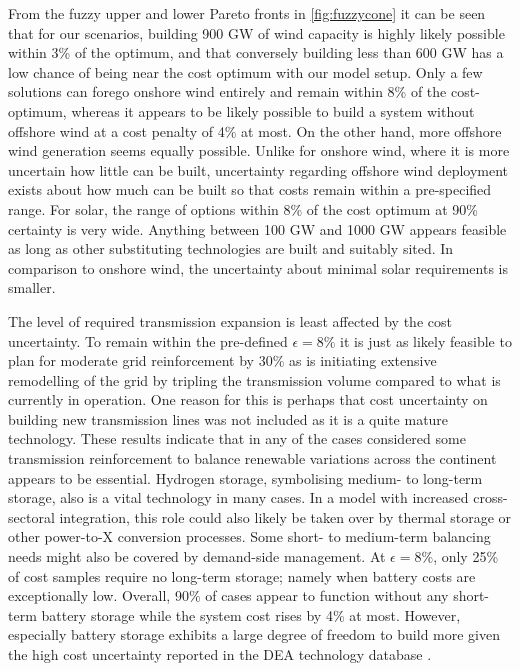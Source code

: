 From the fuzzy upper and lower Pareto fronts in \cref{fig:fuzzycone} it can be
seen that for our scenarios, building 900 GW of wind capacity is highly likely
possible within 3\% of the optimum, and that conversely building less than 600
GW has a low chance of being near the cost optimum with our model setup. Only a
few solutions can forego onshore wind entirely and remain within 8\% of the
cost-optimum, whereas it appears to be likely possible to build a system without
offshore wind at a cost penalty of 4\% at most. On the other hand, more offshore
wind generation seems equally possible. Unlike for onshore wind, where it is
more uncertain how little can be built, uncertainty regarding offshore wind
deployment exists about how much can be built so that costs remain within a
pre-specified range. For solar, the range of options within 8\% of the cost
optimum at 90\% certainty is very wide. Anything between 100 GW and 1000 GW
appears feasible as long as other substituting technologies are built and
suitably sited. In comparison to onshore wind, the uncertainty about minimal
solar requirements is smaller.

The level of required transmission expansion is least affected by the cost
uncertainty. To remain within the pre-defined $\epsilon=8\%$ it is just as
likely feasible to plan for moderate grid reinforcement by 30\% as is initiating
extensive remodelling of the grid by tripling the transmission volume compared
to what is currently in operation. One reason for this is perhaps that cost
uncertainty on building new transmission lines was not included as it is a quite
mature technology. These results indicate that in any of the cases considered
some transmission reinforcement to balance renewable variations across the
continent appears to be essential. Hydrogen storage, symbolising medium- to
long-term storage, also is a vital technology in many cases. In a model with
increased cross-sectoral integration, this role could also likely be taken over
by thermal storage or other power-to-X conversion processes. Some short- to
medium-term balancing needs might also be covered by demand-side management. At
$\epsilon=8\%$, only 25\% of cost samples require no long-term storage; namely
when battery costs are exceptionally low. Overall, 90\% of cases appear to
function without any short-term battery storage while the system cost rises by
4\% at most. However, especially battery storage exhibits a large degree of
freedom to build more given the high cost uncertainty reported in the DEA
technology database \cite{DEA}.


